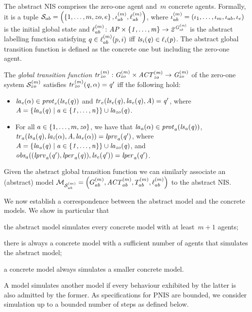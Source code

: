 The abstract  NIS comprises the zero-one agent and~$m$ concrete agents.
Formally, it is a tuple $\mathcal S_{ab} = \left ( \left \{ 1,\ldots,m,zo,e \right \},
\iota^{({m})}_{ab}, \ell^{(m)}_{ab} \right )$, where $\iota^{({m})}_{ab} =
\left ( \iota_{1}, \ldots, \iota_{m}, \iota_{ab}, \iota_{e} \right )$ is the initial global
state   and $\ell^{(m)}_{ab} \colon \it{AP} \times \left \{ 1, \ldots, m  \right \}
\rightarrow 2^{G^{(m)}_{ab}}$ is the abstract labelling function
satisfying $q \in \ell^{(m)}_{ab}(p,i)$ iff $\it{ls}_{i}(q) \in \ell_{i}(p)$. 
The abstract global transition function is  defined
as the concrete one but including the zero-one agent.
\begin{definition}
  \label{def:globaltransition}
  The {\em global transition function} $\it{tr}^{(m)}_{zo} : G^{(m)}_{zo}
  \times \mathit{ACT}^{(m)}_{zo} \rightarrow G^{(m)}_{zo}$ of the zero-one
  system $\mathcal{S}^{(m)}_{zo}$ satisfies $\it{tr}^{(m)}_{zo}(q, \alpha) = q'$ iff the
  following hold:
  \begin{itemize}
    \item $\it{la}_{e}({\alpha}) \in \mathit{prot}_{e}({\it{ls}_{e}(q)})$ and $\mathit{tr}_{e}(\it{ls}_{e}(q),
    \it{la}_{e}({q}), A) = q'$, where
    $A = \left \{ \it{la}_{a}({q}) \mid a \in \left \{ 1,\ldots,n \right \} \right \} \cup
\it{la}_{zo}({q})$.
    \item For all $a \in \left \{ 1,\ldots,m, \it{zo} \right \}$, we have that
    $\it{la}_{a}({\alpha}) \in \mathit{prot}_{a}(\it{ls}_{a}(q))$, $\mathit{tr}_{a} (\it{ls}_{a}(q), \it{la}_{i}({\alpha}),
    A, \it{la}_{e}({\alpha})) = \it{lprv}_{a}(q')$, where  $A = \left \{ \it{la}_{a}({q}) \mid a \in
    \left \{ 1,\ldots,n \right \} \right \} \cup \it{la}_{zo}({q})$, and $\mathit{obs}_{a}((\it{lprv}_{a}(q'),\it{lper}_{a}(q)),\it{ls}_{e}(q')) = \it{lper}_{a}(q')$.
  \end{itemize}
\end{definition}
Given the
abstract global transition function we can similarly associate an (abstract)
model  $\mathcal{M}_{\mathcal{S}_{ab}^{(m)}} = \left ( G^{(m)}_{ab}, \mathit{ACT}^{(m)}_{ab}, T^{(m)}_{ab},
\ell^{(m)}_{ab} \right )$ to the abstract NIS.

We now establish a correspondence between the abstract model and the concrete
models. We show in particular that
\begin{inparaenum}[\it (i)]
\item the abstract model simulates every concrete model with at least~$m+1$
  agents;
\item there is always a concrete model with a sufficient number of agents that
  simulates the abstract model;
\item a concrete model always simulates a smaller concrete model.
\end{inparaenum}
A model simulates another
model if every behaviour exhibited by the latter is also admitted by the former.
As specifications for PNIS are bounded, we consider simulation up to a bounded
number of steps as defined below.

